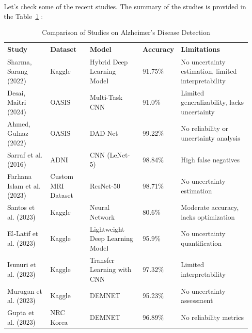 \documentclass[12pt,onecolumn]{report}
\begin{document}
Let's check some of the recent studies. The summary of the studies is provided in the Table~\ref{tab:methods_comparison} :
\begin{table}[h!]
    \centering
    \caption{Comparison of Studies on Alzheimer’s Disease Detection}
    \label{tab:methods_comparison}
    \begin{tabular}{|p{3cm}|p{3cm}|p{3cm}|p{2cm}|p{4cm}|}
        \hline
        \textbf{Study} & \textbf{Dataset} & \textbf{Model} & \textbf{Accuracy} & \textbf{Limitations} \\ \hline
        Sharma, Sarang (2022) \cite{2022Sarang} & Kaggle & Hybrid Deep Learning Model & 91.75\% & No uncertainty estimation, limited interpretability \\ \hline
        Desai, Maitri (2024) \cite{2024Desai} & OASIS & Multi-Task CNN & 91.0\% & Limited generalizability, lacks uncertainty \\ \hline
        Ahmed, Gulnaz (2022) \cite{2022Ahmed} & OASIS & DAD-Net & 99.22\% & No reliability or uncertainty analysis \\ \hline
        Sarraf et al. (2016) \cite{sarraf2016} & ADNI & CNN (LeNet-5) & 98.84\% & High false negatives \\ \hline
        Farhana Islam et al. (2023) \cite{Islam2023} & Custom MRI Dataset & ResNet-50 & 98.71\% & No uncertainty estimation \\ \hline
        Santos et al. (2023)  \cite{Santos2023} & Kaggle & Neural Network & 80.6\% & Moderate accuracy, lacks optimization \\ \hline
        El-Latif et al. (2023) \cite{Latif2023} & Kaggle & Lightweight Deep Learning Model & 95.9\% & No uncertainty quantification \\ \hline
        Isunuri et al. (2023) \cite{Isunuri2023} & Kaggle & Transfer Learning with CNN & 97.32\% & Limited interpretability \\ \hline
        Murugan et al. (2023) \cite{Murugan2021} & Kaggle & DEMNET & 95.23\% & No uncertainty assessment \\ \hline
        Gupta et al. (2023) \cite{Gupta2019} & NRC Korea & DEMNET & 96.89\% & No reliability metrics \\ \hline
    \end{tabular}
\end{table}
\end{document}
